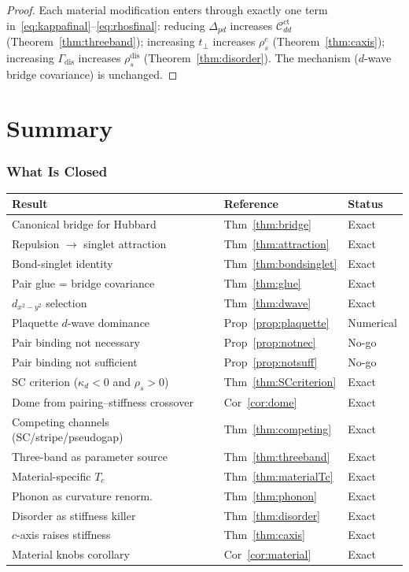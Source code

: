\documentclass[12pt]{article}
\theoremstyle{plain}
\theoremstyle{definition}
\numberwithin{equation}{section}
\begin{document}
\begin{proof}
Each material modification enters through exactly one term
in~\eqref{eq:kappafinal}--\eqref{eq:rhosfinal}:
reducing $\Delta_{pd}$ increases $\mathcal{C}_{dd}^{\mathrm{ct}}$
(Theorem~\ref{thm:threeband});
increasing $t_\perp$ increases $\rho_s^c$
(Theorem~\ref{thm:caxis});
increasing $\Gamma_{\mathrm{dis}}$ increases
$\rho_s^{\mathrm{dis}}$ (Theorem~\ref{thm:disorder}).
The mechanism ($d$-wave bridge covariance) is unchanged.
\end{proof}


\part{Summary}

\section{What Is Closed}\label{sec:closed}

\begin{center}
\begin{tabular}{lll}
\toprule
Result & Reference & Status\\
\midrule
Canonical bridge for Hubbard & Thm~\ref{thm:bridge} & Exact\\
Repulsion $\to$ singlet attraction & Thm~\ref{thm:attraction} & Exact\\
Bond-singlet identity & Thm~\ref{thm:bondsinglet} & Exact\\
Pair glue = bridge covariance & Thm~\ref{thm:glue} & Exact\\
$d_{x^2-y^2}$ selection & Thm~\ref{thm:dwave} & Exact\\
Plaquette $d$-wave dominance & Prop~\ref{prop:plaquette} & Numerical\\
Pair binding not necessary & Prop~\ref{prop:notnec} & No-go\\
Pair binding not sufficient & Prop~\ref{prop:notsuff} & No-go\\
SC criterion ($\kappa_d<0$ and $\rho_s>0$) & Thm~\ref{thm:SCcriterion} & Exact\\
Dome from pairing--stiffness crossover & Cor~\ref{cor:dome} & Exact\\
Competing channels (SC/stripe/pseudogap) & Thm~\ref{thm:competing} & Exact\\
Three-band as parameter source & Thm~\ref{thm:threeband} & Exact\\
Material-specific $T_c$ & Thm~\ref{thm:materialTc} & Exact\\
Phonon as curvature renorm.\ & Thm~\ref{thm:phonon} & Exact\\
Disorder as stiffness killer & Thm~\ref{thm:disorder} & Exact\\
$c$-axis raises stiffness & Thm~\ref{thm:caxis} & Exact\\
Material knobs corollary & Cor~\ref{cor:material} & Exact\\
\bottomrule
\end{tabular}
\end{center}
\end{document}

